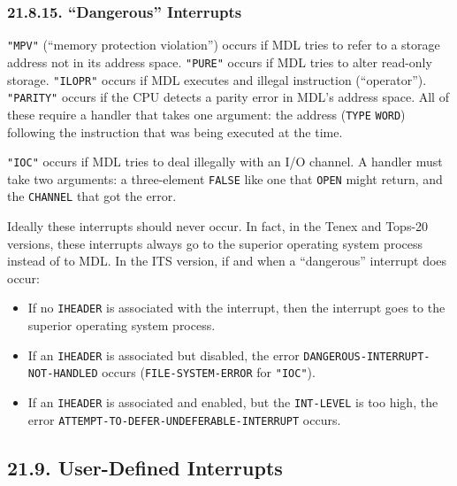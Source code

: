 \documentclass[a4paper,]{article}
\providecommand{\tightlist}{%
  \setlength{\itemsep}{0pt}\setlength{\parskip}{0pt}}
\begin{document}
\subsubsection{\texorpdfstring{21.8.15. ``Dangerous''
Interrupts}{21.8.15. Dangerous Interrupts}}\label{dangerous-interrupts}

\texttt{"MPV"}  (``memory protection violation'') occurs if MDL tries to refer to a storage
address not in its address space. \texttt{"PURE"}  occurs if MDL tries to alter read-only
storage. \texttt{"ILOPR"}  occurs if MDL executes and illegal instruction (``operator'').
\texttt{"PARITY"}  occurs if the CPU detects a parity error in MDL's address space. All
of these require a handler that takes one argument: the address (\texttt{TYPE} \texttt{WORD}) following the instruction
that was being executed at the time.

\texttt{"IOC"}  occurs if MDL tries to deal illegally with an I/O channel. A handler must
take two arguments: a three-element \texttt{FALSE} like one that \texttt{OPEN} might return, and the \texttt{CHANNEL} that
got the error.

Ideally these interrupts should never occur. In fact, in the Tenex and
Tops-20 versions, these interrupts always go to the superior operating system process instead of to
MDL. In the ITS version, if and when a ``dangerous'' interrupt does occur:

\begin{itemize}
\tightlist
\item
  If no \texttt{IHEADER} is associated with the interrupt, then the interrupt goes to the superior operating system
  process.
\item
  If an \texttt{IHEADER} is associated but disabled, the error \texttt{DANGEROUS-INTERRUPT-NOT-HANDLED} occurs
  (\texttt{FILE-SYSTEM-ERROR} for \texttt{"IOC"}).
\item
  If an \texttt{IHEADER} is associated and enabled, but the \texttt{INT-LEVEL} is too high, the error
  \texttt{ATTEMPT-TO-DEFER-UNDEFERABLE-INTERRUPT} occurs.
\end{itemize}

\subsection{21.9. User-Defined Interrupts}\label{user-defined-interrupts}
\end{document}
